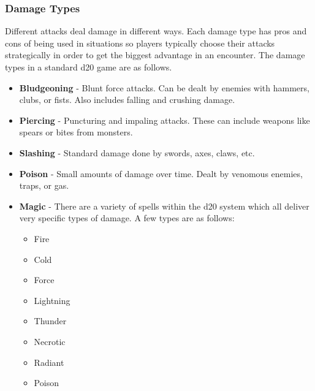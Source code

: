 \documentclass[12pt,a4paper]{report}
\begin{document}
		\subsubsection{Damage Types}
			Different attacks deal damage in different ways. Each damage type has pros and cons of being used in situations so players typically choose their attacks strategically in order to get the biggest advantage in an encounter. The damage types in  a standard d20 game are as follows. 
		\begin{itemize}
			\item \textbf{Bludgeoning} - Blunt force attacks. Can be dealt by enemies with hammers, clubs, or fists. Also includes falling and crushing damage.
			\item \textbf{Piercing} - Puncturing and impaling attacks. These can include weapons like spears or bites from monsters.
			\item \textbf{Slashing} - Standard damage done by swords, axes, claws, etc.
			\item \textbf{Poison} - Small amounts of damage over time. Dealt by venomous enemies, traps, or gas.
			\item \textbf{Magic} - There are a variety of spells within the d20 system which all deliver very specific types of damage. A few types are as follows:
			\begin{multicols}{2}
				\begin{itemize}
				\item Fire
				\item Cold
				\item Force
				\item Lightning
				\item Thunder
				\item Necrotic
				\item Radiant
				\item Poison
				\end{itemize}
			\end{multicols}
		\end{itemize}
		\newpage
\end{document}
